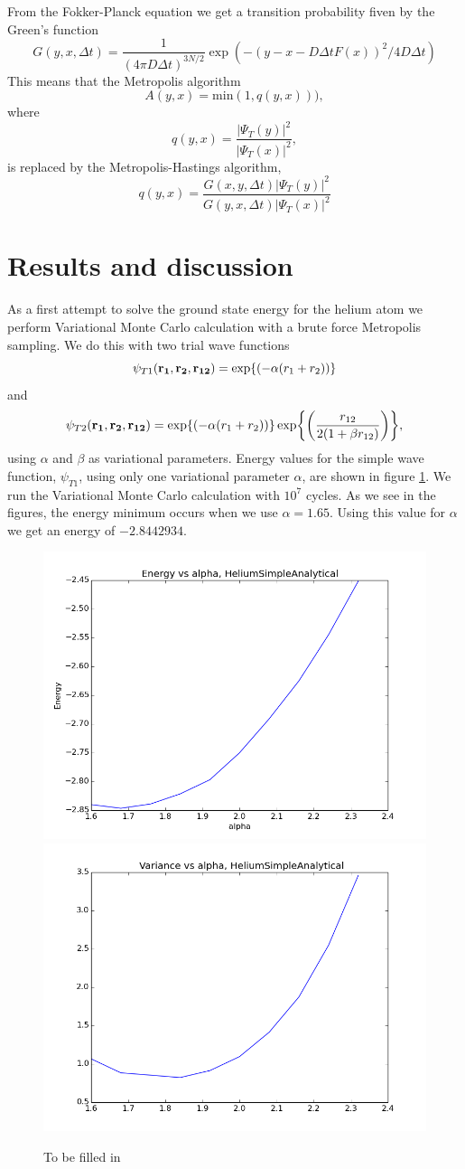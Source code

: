 \documentclass[11pt]{article}
\begin{document}
From the Fokker-Planck equation we get a transition probability fiven
by the Green's function
\[
G(y,x,\Delta t)=\frac{1}{(4\pi D\Delta t)^{3N/2}}\exp{\left(-(y-x-D\Delta tF(x))^{2}/4D\Delta t\right)}
\]
This means that the Metropolis algorithm
\[
A(y,x)=\mathrm{min}(1,q(y,x))),
\]
where 
\[
q(y,x)=\frac{|\Psi_{T}(y)|^{2}}{|\Psi_{T}(x)|^{2}},
\]
is replaced by the Metropolis-Hastings algorithm,
\[
q(y,x)=\frac{G(x,y,\Delta t)|\Psi_{T}(y)|^{2}}{G(y,x,\Delta t)|\Psi_{T}(x)|^{2}}
\]




\section{Results and discussion}
	

As a first attempt to solve the ground state energy for the helium
atom we perform Variational Monte Carlo calculation with a brute force
Metropolis sampling. We do this with two trial wave functions
\[
\psi_{T1}({\bf r_{1}},{\bf r_{2}},{\bf r_{12}})=\exp{\left(-\alpha(r_{1}+r_{2})\right)}
\]
and 
\[
\psi_{T2}({\bf r_{1}},{\bf r_{2}},{\bf r_{12}})=\exp{\left(-\alpha(r_{1}+r_{2})\right)}\exp{\left(\frac{r_{12}}{2(1+\beta r_{12})}\right)},
\]
using $\alpha$ and $\beta$ as variational parameters. Energy values
for the simple wave function, $\psi_{T1}$, using only one variational
parameter $\alpha$, are shown in figure \ref{fig01:alpha_Simple}.
We run the Variational Monte Carlo calculation with $10^{7}$ cycles.
As we see in the figures, the energy minimum occurs when we use $\alpha=1.65$.
Using this value for $\alpha$ we get an energy of $-2.8442934$. 

\begin{figure}
\centering \includegraphics[width=0.45\linewidth]{figures/EnergyVsAlphaHeliumSimpleAnalytical}
\includegraphics[width=0.45\linewidth]{figures/VarianceVsAlphaHeliumSimpleAnalytical}
\protect\caption{To be filled in}
\label{fig01:alpha_Simple} 
\end{figure}
\end{document}
